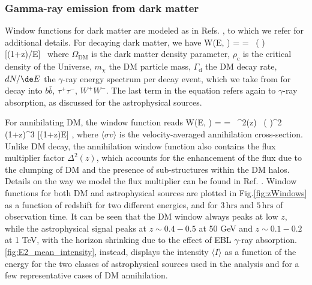 \subsubsection{Gamma-ray emission from dark matter}
\label{app:WDM}

Window functions for dark matter are modeled as in Refs. \cite{camera2015tomographic,fornengo2014particle,Cuoco:2015rfa}, to which we refer for additional details. For decaying dark matter, we have
%
 \be
     W(E, \chi) =  = \, \left ( \right) \,   [(1+z)/E] \, \exp[-\tau(E,z)]
     \label{eqn:Wdec}
 \ee
%
where $\varOmega_\textrm{DM}$ is the dark matter density parameter, $\rho_\textrm{c}$ is the critical density of the Universe,
$m_{\chi}$ the DM particle mass, $\varGamma_\textrm{d}$ the DM decay rate, $dN/\de E$ the $\gamma$-ray energy spectrum per decay event, which we take from \cite{Arina:2023eic} for decay into $b\bar{b}$, $\tau^+ \tau^-$, $W^+ W^-$. The last term in the equation refers again to $\gamma$-ray absorption, as discussed for the astrophysical sources.


For annihilating DM, the window function reads
%
 \be
     W(E, \chi) =  =  \,  \varDelta^2(z) \, \left ( \right)^2 (1+z)^3  [(1+z)E]  \exp[-\tau(E,z)]\;,
     \label{eqn:Wann}
 \ee
%
where  $\langle \sigma v \rangle$ is the velocity-averaged annihilation cross-section. Unlike DM decay, the annihilation window function also contains the flux multiplier factor $\varDelta^2(z)$, which accounts for the enhancement of the flux due to the clumping of DM and the presence of sub-structures within the DM halos. Details on the way we model the flux multiplier can be found in Ref. \cite{Pinetti:2021jjs,Pinetti:2019ztr,Arcari:2022zul}.
Window functions for both DM and astrophysical sources are plotted in Fig.\ref{fig:zWindows} as a function of redshift for two different energies, and for $3\,\textrm{hrs}$ and $5\,\textrm{hrs}$ of observation time. It can be seen that the DM window always peaks at low $z$, while the astrophysical signal peaks at $z\sim 0.4-0.5$ at 50 GeV and  $z\sim 0.1-0.2$ at 1 TeV, with the horizon shrinking due to the effect of EBL $\gamma$-ray absorption.
\cref{fig:E2_mean_intensity}, instead, displays the intensity $\langle I \rangle$ as a function of the energy for the two classes of astrophysical sources used in the analysis and for a few representative cases of DM annihilation. 


